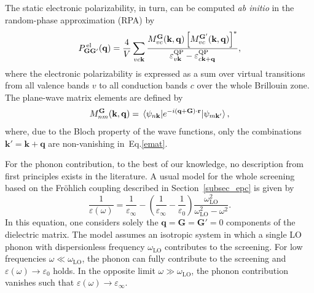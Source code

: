 %
The static electronic polarizability, in turn, can be computed \textit{ab initio} in the random-phase approximation (RPA) by\cite{pusching_phd}
%
\begin{equation}\label{eps_rpa}
    P^{\hspace{.5mm}\text{el}}_\mathbf{GG'}(\mathbf{q}) = \frac{4}{V}\sum_{vc\mathbf{k}}\frac{M^{\mathbf{G}}_{vc}(\mathbf{k,q})\left[M^\mathbf{G'}_{vc}(\mathbf{k,q})\right]^*}{\varepsilon^\text{QP}_{v\mathbf{k}} - \varepsilon^\text{QP}_{c\mathbf{k+q}}},
\end{equation}
%
where the electronic polarizability is expressed as a sum over virtual transitions from all valence bands $v$ to all conduction bands $c$ over the whole Brillouin zone.  The plane-wave matrix elements are defined by
\begin{align}\label{emat}
    M^{\mathbf{G}}_{nm}(\mathbf{k,q}) = \mel{\psi_{n\mathbf{k}}}{e^{-i\mathbf{(q+G)\cdot r}}}{\psi_{m\mathbf{k'}}},
\end{align}
where, due to the Bloch property of the wave functions, only the combinations $\mathbf{k'=k+q}$ are non-vanishing in~Eq.\;\eqref{emat}.\par For the phonon contribution, to the best of our knowledge, no description from first principles exists in the literature. A usual model for the whole screening based on the Fr\"ohlich coupling described in Section~\ref{subsec_epc}  is given by\cite{bechstedt2016many}
%
\begin{equation}\label{screen_model}
        \frac{1}{\varepsilon(\omega)}=\frac{1}{\varepsilon_{\infty}}-\left(\frac{1}{\varepsilon_{\infty}}-\frac{1}{\varepsilon_0}\right)\frac{\omega_{\text{LO}}^2}{\omega_{\text{LO}}^2-\omega^2}.
\end{equation}
%
In this equation, one considers solely the $\mathbf{q=G=G'}=0$ components of the dielectric matrix. The model assumes an isotropic system in which a single LO phonon with dispersionless frequency $\omega^{\phantom{I}}_\text{LO}$  contributes to the screening. For low frequencies $\omega\ll\omega^{\phantom{I}}_\text{LO}$, the phonon can fully contribute to the screening and $\varepsilon(\omega)\rightarrow\varepsilon_0$ holds. In the opposite limit $\omega\gg\omega^{\phantom{I}}_\text{LO}$, the phonon contribution vanishes such that $\varepsilon(\omega)\rightarrow\varepsilon_\infty$. 
\vfill
